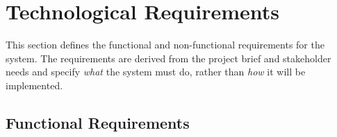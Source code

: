 \documentclass{article}
\begin{document}

\section{Technological Requirements}
This section defines the functional and non-functional requirements for the system.
The requirements are derived from the project brief and stakeholder needs and specify
\emph{what} the system must do, rather than \emph{how} it will be implemented.


\subsection{Functional Requirements}
\end{document}
